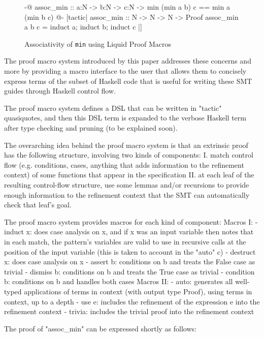 \begin{figure}
\begin{code}
  {-@ assoc_min :: a:N -> b:N -> c:N ->
        {min (min a b) c == min a (min b c)} @-}
  [tactic|
    assoc_min :: N -> N -> N -> Proof
    assoc_min a b c = induct a; induct b; induct c
  |]
\end{code}
\caption{Associativity of \texttt{min} using Liquid Proof Macros}
\label{fig:assoc-min-macro}
\end{figure}

The proof macro system introduced by this paper addresses these concerns and more by providing a macro interface to the user that allows them to concisely express terms of the subset of Haskell code that is useful for writing these SMT guides through Haskell control flow.

The proof macro system defines a DSL that can be written in "tactic" quasiquotes, and then this DSL term is expanded to the verbose Haskell term after type checking and pruning (to be explained soon).

The overarching idea behind the proof macro system is that an extrinsic proof has the following structure, involving two kinds of components:
I. match control flow (e.g. conditions, cases, anything that adds information to the refinement context) of some functions that appear in the specification
II. at each leaf of the resulting control-flow structure, use some lemmas and/or recursions to provide enough information to the refinement context that the SMT can automatically check that leaf's goal.

The proof macro system provides macros for each kind of component:
Macros I:
- induct x: does case analysis on x, and if x was an input variable then notes that in each match, the pattern's variables are valid to use in recursive calls at the position of the input variable (this is taken to account in the "auto" c)
- destruct x: does case analysis on x
- assert b: conditions on b and treats the False case as trivial 
- dismiss b: conditions on b and treats the True case as trivial
- condition b: conditions on b and handles both cases
Macros II:
- auto: generates all well-typed applications of terms in context (with output type Proof), using terms in context, up to a depth
- use e: includes the refinement of the expression e into the refinement context
- trivia: includes the trivial proof into the refinement context

The proof of "assoc\_min" can be expressed shortly as follows:


